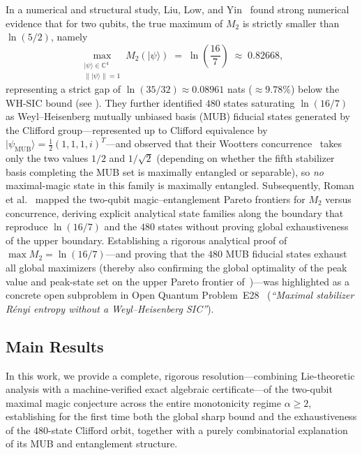 \documentclass[11pt,a4paper]{article}
\theoremstyle{plain}
\theoremstyle{definition}
\theoremstyle{remark}
\newcommand{\C}{\mathbb{C}}
\newcommand{\ket}[1]{\lvert #1 \rangle}
\newcommand{\psimub}{\ket{\psi_{\mathrm{MUB}}}}
\begin{document}
In a numerical and structural study, Liu, Low, and Yin~\cite{LiuLowYin2026} found strong numerical evidence that for two qubits, the true maximum of $M_2$ is strictly smaller than $\ln(5/2)$, namely
\begin{equation}
  \max_{\substack{\ket{\psi}\in\C^4 \\ \lVert\ket{\psi}\rVert = 1}} M_2(\ket{\psi}) \;=\; \ln\!\left(\frac{16}{7}\right) \;\approx\; 0.82668,
\end{equation}
representing a strict gap of $\ln(35/32) \approx 0.08961$ nats ($\approx 9.78\%$) below the WH-SIC bound (see ). They further identified $480$ states saturating $\ln(16/7)$ as Weyl--Heisenberg mutually unbiased basis (MUB) fiducial states generated by the Clifford group---represented up to Clifford equivalence by $\psimub = \tfrac{1}{2}(1, 1, 1, i)^T$---and observed that their Wootters concurrence~\cite{Wootters1998} takes only the two values $1/2$ and $1/\sqrt{2}$ (depending on whether the fifth stabilizer basis completing the MUB set is maximally entangled or separable), so \emph{no} maximal-magic state in this family is maximally entangled. Subsequently, Roman et al.~\cite{Roman2026} mapped the two-qubit magic--entanglement Pareto frontiers for $M_2$ versus concurrence, deriving explicit analytical state families along the boundary that reproduce $\ln(16/7)$ and the $480$ states without proving global exhaustiveness of the upper boundary. Establishing a rigorous analytical proof of $\max M_2 = \ln(16/7)$---and proving that the $480$ MUB fiducial states exhaust all global maximizers (thereby also confirming the global optimality of the peak value and peak-state set on the upper Pareto frontier of~\cite{Roman2026})---was highlighted as a concrete open subproblem in Open Quantum Problem~E28~\cite{OpenQuantumE28} (\emph{``Maximal stabilizer R\'enyi entropy without a Weyl--Heisenberg SIC''}).

\subsection{Main Results}

In this work, we provide a complete, rigorous resolution---combining Lie-theoretic analysis with a machine-verified exact algebraic certificate---of the two-qubit maximal magic conjecture across the entire monotonicity regime $\alpha \ge 2$, establishing for the first time both the global sharp bound and the exhaustiveness of the $480$-state Clifford orbit, together with a purely combinatorial explanation of its MUB and entanglement structure.
\end{document}
